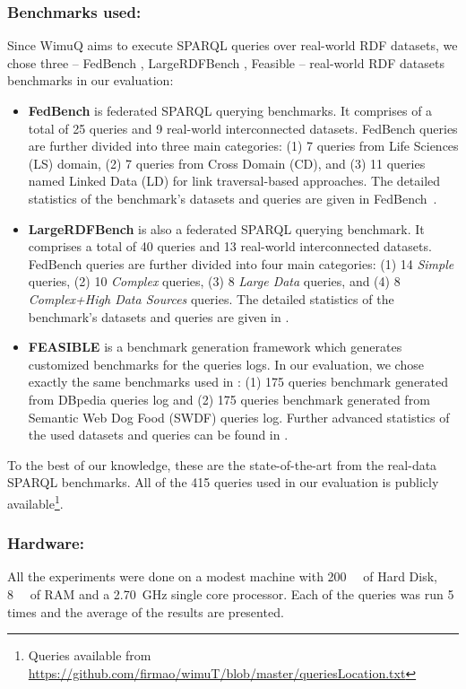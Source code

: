 \documentclass[sw]{iosart2x}
\begin{document}
\subsubsection{Benchmarks used:} Since WimuQ aims to execute SPARQL queries over real-world RDF datasets, we chose three -- FedBench \cite{fedbench2011}, LargeRDFBench \cite{largerdfbench2017}, Feasible \cite{feasible2015} -- real-world RDF datasets benchmarks in our evaluation: 
\begin{itemize}
  
\item \textbf{FedBench} is federated SPARQL querying benchmarks. It comprises of a total of 25 queries and 9 real-world interconnected datasets. FedBench queries are further divided into three main categories: (1) 7 queries from Life Sciences (LS) domain, (2) 7 queries from Cross Domain (CD), and (3) 11 queries named Linked Data (LD) for link traversal-based approaches. The detailed statistics of the benchmark's datasets and queries are given in FedBench~\cite{fedbench2011}.

\item  \textbf{LargeRDFBench} is also a federated SPARQL querying benchmark. It comprises a total of 40 queries and 13 real-world interconnected datasets. FedBench queries are further divided into four main categories: (1) 14 \emph{Simple} queries, (2) 10 \emph{Complex} queries, (3)  8 \emph{Large Data} queries, and (4) 8 \emph{Complex+High Data Sources} queries. The detailed statistics of the benchmark's datasets and queries are given in \cite{largerdfbench2017}. 

\item  \textbf{FEASIBLE} is a benchmark generation framework which generates customized benchmarks for the queries logs. In our evaluation, we chose exactly the same benchmarks used in \cite{feasible2015}: (1) 175 queries benchmark generated from DBpedia queries log and (2) 175 queries benchmark generated from Semantic Web Dog Food (SWDF) queries log. Further advanced statistics of the used datasets and queries can be found in \cite{feasible2015}. 
\end{itemize}
To the best of our knowledge, these are the state-of-the-art from the real-data SPARQL benchmarks. All of the 415 queries used in our evaluation is publicly available\footnote{Queries available from \url{https://github.com/firmao/wimuT/blob/master/queriesLocation.txt}}. 

\subsubsection{Hardware:} All the experiments were done on a modest machine with \SI{200}{\gibi\byte} of Hard Disk, \SI{8}{\gibi\byte} of RAM and a \SI{2.70}{\GHz} single core processor. Each of the queries was run 5 times and the average of the results are presented.  
\end{document}
